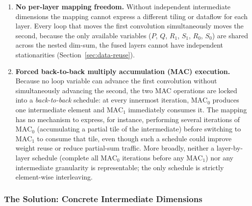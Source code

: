 \begin{enumerate}
  \item \textbf{No per-layer mapping freedom.}
        Without independent intermediate dimensions the mapping cannot
        express a different tiling or dataflow for each layer.
        Every loop that moves the first convolution simultaneously
        moves the second, because the only available variables ($P$,
        $Q$, $R_1$, $S_1$, $R_0$, $S_0$) are shared across the
        nested dim-sum, the fused layers cannot have independent stationarities
        (Section~\ref{sec:data-reuse}).

  \item \textbf{Forced back-to-back multiply accumulation (MAC) execution.}
        Because no loop variable can advance the first convolution
        without simultaneously advancing the second, the two MAC
        operations are locked into a \emph{back-to-back} schedule:
        at every innermost iteration, $\text{MAC}_0$ produces one
        intermediate element and $\text{MAC}_1$ immediately consumes
        it.
        The mapping has no mechanism to express, for instance,
        performing several iterations of $\text{MAC}_0$ (accumulating
        a partial tile of the intermediate) before switching to
        $\text{MAC}_1$ to consume that tile, even though such a
        schedule could improve weight reuse or reduce partial-sum
        traffic.
        More broadly, neither a layer-by-layer schedule (complete all
        $\text{MAC}_0$ iterations before any $\text{MAC}_1$) nor any
        intermediate granularity is representable; the only schedule
        is strictly element-wise interleaving.
\end{enumerate}


\subsubsection{The Solution: Concrete Intermediate Dimensions}
\label{sec:ps-alias-concrete}

